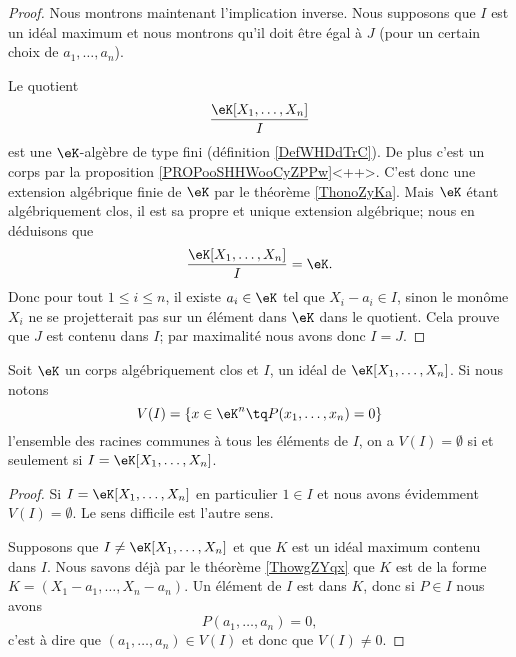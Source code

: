 \begin{proof}
    Nous montrons maintenant l'implication inverse. Nous supposons que \( I\) est un idéal maximum et nous montrons qu'il doit être égal à \( J\) (pour un certain choix de \( a_1,\ldots, a_n\)).

    Le quotient
    \begin{equation}
        \frac{ \eK[X_1,\ldots, X_n] }{ I }
    \end{equation}
    est une \( \eK\)-algèbre de type fini (définition \ref{DefWHDdTrC}). De plus c'est un corps par la proposition \ref{PROPooSHHWooCyZPPw}<++>. C'est donc une extension algébrique finie de \( \eK\) par le théorème \ref{ThonoZyKa}. Mais \( \eK\) étant algébriquement clos, il est sa propre et unique extension algébrique; nous en déduisons que
    \begin{equation}
        \frac{ \eK[X_1,\ldots, X_n] }{ I }=\eK.
    \end{equation}
    Donc pour tout \( 1\leq i\leq n\), il existe \( a_i\in \eK\) tel que \( X_i-a_i\in I\), sinon le monôme \( X_i\) ne se projetterait pas sur un élément dans \( \eK\) dans le quotient. Cela prouve que \( J\) est contenu dans \( I\); par maximalité nous avons donc \( I=J\).
\end{proof}

\begin{corollary}
    Soit \( \eK\) un corps algébriquement clos et \( I\), un idéal de \( \eK[X_1,\ldots, X_n]\). Si nous notons
    \begin{equation}
        V(I)=\{ x\in \eK^n\tq P(x_1,\ldots, x_n)=0 \}
    \end{equation}
    l'ensemble des racines communes à tous les éléments de \( I\), on a \( V(I)=\emptyset\) si et seulement si \( I=\eK[X_1,\ldots, X_n]\).
\end{corollary}

\begin{proof}
    Si \( I=\eK[X_1,\ldots, X_n]\) en particulier \( 1\in I\) et nous avons évidemment \( V(I)=\emptyset\). Le sens difficile est l'autre sens.

    Supposons que \( I\neq \eK[X_1,\ldots, X_n]\) et que \( K\) est un idéal maximum contenu dans \( I\). Nous savons déjà par le théorème \ref{ThowgZYqx} que \( K\) est de la forme \( K=(X_1-a_1,\ldots, X_n-a_n)\). Un élément de \( I\) est dans \( K\), donc si \( P\in I\) nous avons
    \begin{equation}
        P(a_1,\ldots, a_n)=0,
    \end{equation}
    c'est à dire que \( (a_1,\ldots, a_n)\in V(I)\) et donc que \( V(I)\neq 0\).
\end{proof}


